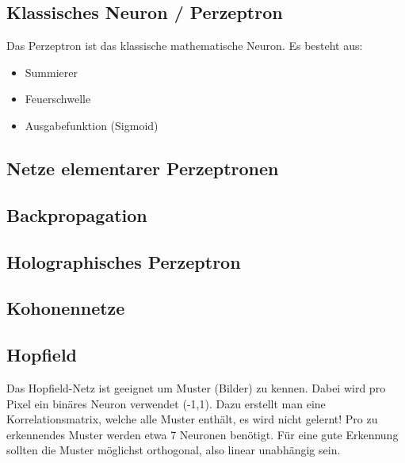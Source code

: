\subsection{Klassisches Neuron / Perzeptron}
Das Perzeptron ist das klassische mathematische Neuron. Es besteht aus:
\begin{itemize}
	\item Summierer
	\item Feuerschwelle
	\item Ausgabefunktion (Sigmoid)
\end{itemize}
\subsection{Netze elementarer Perzeptronen}
\subsection{Backpropagation}
\subsection{Holographisches Perzeptron}
\subsection{Kohonennetze}
\subsection{Hopfield}
Das Hopfield-Netz ist geeignet um Muster (Bilder) zu kennen. Dabei wird pro Pixel ein binäres Neuron verwendet (-1,1).
Dazu erstellt man eine Korrelationsmatrix, welche alle Muster enthält, es wird nicht gelernt!
Pro zu erkennendes Muster werden etwa 7 Neuronen benötigt.
Für eine gute Erkennung sollten die Muster möglichst orthogonal, also linear unabhängig sein.

